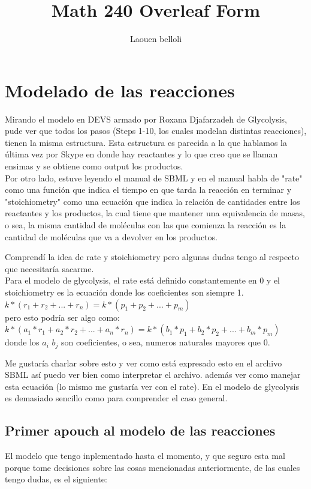 \documentclass[12pt]{article}
\title{Math 240 Overleaf Form}
\author {Laouen belloli}
\begin{document}
\section*{Modelado de las reacciones}

Mirando el modelo en DEVS armado por Roxana Djafarzadeh de Glycolysis, pude ver que todos los pasos (Steps 1-10, los cuales modelan distintas reacciones), tienen la misma estructura. Esta estructura es parecida a la que hablamos la última vez por Skype en donde hay reactantes y lo que creo que se llaman ensimas y se obtiene como output los productos. \\

Por otro lado, estuve leyendo el manual de SBML y en el manual habla de "rate" como una función que indica el tiempo en que tarda la reacción en terminar y "stoichiometry" como una ecuación que indica la relación de cantidades entre los reactantes y los productos, la cual tiene que mantener una equivalencia de masas, o sea, la misma cantidad de moléculas con las que comienza la reacción es la cantidad de moléculas que va a devolver en los productos.

Comprendí la idea de rate y stoichiometry pero algunas dudas tengo al respecto que necesitaría sacarme. \\

Para el modelo de glycolysis, el rate está definido constantemente en 0 y el stoichiometry es la ecuación donde los coeficientes son siempre 1. \\

$k*(r_1 + r_2 + ... + r_n) = k*(p_1 + p_2 + ... + p_m)$ \\

pero esto podría ser algo como: \\

$k*(a_1*r_1 + a_2*r_2 + ... + a_n*r_n) = k*(b_1*p_1 + b_2*p_2 + ... + b_m*p_m)$ \\

donde los $a_i$ $b_j$ son coeficientes, o sea, numeros naturales mayores que 0.

Me gustaría charlar sobre esto y ver como está expresado esto en el archivo SBML así puedo ver bien como interpretar el archivo. además ver como manejar esta ecuación (lo mismo me gustaría ver con el rate). En el modelo de glycolysis es demasiado sencillo como para comprender el caso general.

\newpage
\subsection*{Primer apouch al modelo de las reacciones}
El modelo que tengo inplementado hasta el momento, y que seguro esta mal porque tome decisiones sobre las cosas mencionadas anteriormente, de las cuales tengo dudas, es el siguiente: \\
\end{document}
